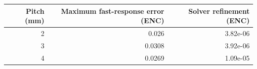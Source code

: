 \begin{tabular}{rrr}
\toprule
Pitch (mm) & Maximum fast-response error (ENC) & Solver refinement (ENC) \\
\midrule
2 & 0.026 & 3.82e-06 \\
3 & 0.0308 & 3.92e-06 \\
4 & 0.0269 & 1.09e-05 \\
\bottomrule
\end{tabular}
